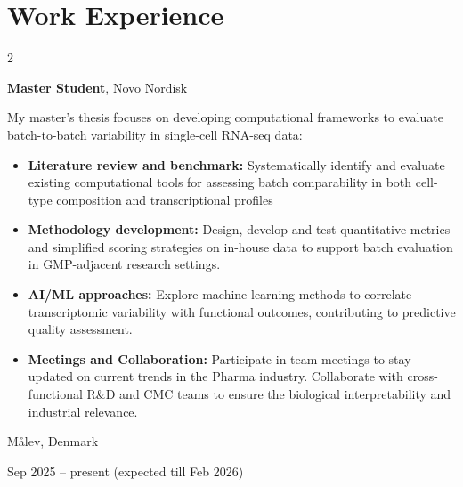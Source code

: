 \documentclass[10pt, letterpaper]{article}
\newenvironment{highlights}{
    \begin{itemize}[
        topsep=0.10 cm,
        parsep=0.10 cm,
        partopsep=0pt,
        itemsep=0pt,
        leftmargin=0.4 cm + 10pt
    ]
}{
    \end{itemize}
} %
\newenvironment{twocolentry}[2][]{
    \onecolentry
    \def\secondColumn{#2}
    \setcolumnwidth{\fill, 4.5 cm}
    \begin{paracol}{2}
}{
    \switchcolumn \raggedleft \secondColumn
    \end{paracol}
    \endonecolentry
} %
\begin{document}
    
    
    \section{Work Experience}

        \begin{twocolentry}{
    Målev, Denmark

    Sep 2025 – present (expected till Feb 2026)
}
    \textbf{Master Student}, Novo Nordisk

    \vspace{0.1cm}
    
     My master’s thesis focuses on developing computational frameworks to evaluate batch-to-batch variability in single-cell RNA-seq data:

    \begin{highlights}
        \item \textbf{Literature review and benchmark:} Systematically identify and evaluate existing computational tools for assessing batch comparability in both cell-type composition and transcriptional profiles

        \vspace{0.1cm}

        \item \textbf{Methodology development:} Design, develop and test quantitative metrics and simplified scoring strategies on in-house data to support batch evaluation in GMP-adjacent research settings.

        \vspace{0.1cm}

        \item \textbf{AI/ML approaches:} Explore machine learning methods to correlate transcriptomic variability with functional outcomes, contributing to predictive quality assessment.

        \vspace{0.1cm}

        \item \textbf{Meetings and Collaboration:} Participate in team meetings to stay updated on current trends in the Pharma industry. Collaborate with cross-functional R\&D and CMC teams to ensure the biological interpretability and industrial relevance.
    \end{highlights}
\end{twocolentry}


        \vspace{0.3 cm}
\end{document}
